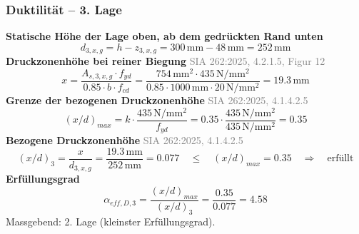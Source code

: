 \documentclass[11pt,a4paper]{article}
\newcommand{\normref}[1]{{\small\textcolor{gray}{#1}}}
\begin{document}
\subsubsection{Duktilität – 3. Lage}
\noindent\textbf{Statische Höhe der Lage oben, ab dem gedrückten Rand unten}
\begin{equation*}
d_{3,x,g} = h - z_{3,x,g} = 300\,\mathrm{mm} - 48\,\mathrm{mm} = 252\,\mathrm{mm}
\end{equation*}
\noindent\textbf{Druckzonenhöhe bei reiner Biegung} \hfill \normref{SIA 262:2025, 4.2.1.5, Figur 12}
\begin{equation*}
x = \frac{A_{s,3,x,g} \cdot f_{yd}}{0.85 \cdot b \cdot f_{cd}} = \frac{754\,\mathrm{mm}^{2} \cdot 435\,\mathrm{N}/\mathrm{mm}^{2}}{0.85 \cdot 1000\,\mathrm{mm} \cdot 20\,\mathrm{N}/\mathrm{mm}^{2}} = 19.3\,\mathrm{mm}
\end{equation*}
\noindent\textbf{Grenze der bezogenen Druckzonenhöhe} \hfill \normref{SIA 262:2025, 4.1.4.2.5}
\begin{equation*}
\left(x/d\right)_{max} = k \cdot \frac{435\,\mathrm{N/mm^2}}{f_{yd}} = 0.35 \cdot \frac{435\,\mathrm{N/mm^2}}{435\,\mathrm{N}/\mathrm{mm}^{2}} = 0.35
\end{equation*}
\noindent\textbf{Bezogene Druckzonenhöhe} \hfill \normref{SIA 262:2025, 4.1.4.2.5}
\begin{equation*}
\left(x/d\right)_{3} = \frac{x}{d_{3,x,g}} = \frac{19.3\,\mathrm{mm}}{252\,\mathrm{mm}} = 0.077 \quad \le \quad \left(x/d\right)_{max} = 0.35 \quad \Rightarrow \quad \text{erfüllt}
\end{equation*}
\noindent\textbf{Erfüllungsgrad}
\begin{equation*}
\alpha_{eff,D,3} = \frac{\left(x/d\right)_{max}}{\left(x/d\right)_{3}} = \frac{0.35}{0.077} = 4.58
\end{equation*}
Massgebend: 2. Lage (kleinster Erfüllungsgrad).
\end{document}
